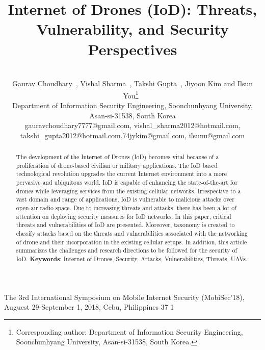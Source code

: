 \documentclass{easychair}
\begin{document}
%
\title{Internet of Drones (IoD): Threats, Vulnerability, and Security Perspectives}

%

\volumeinfo
{The 3rd International Symposium on Mobile Internet Security (MobiSec'18), Auguest 29-September 1, 2018, Cebu, Philippines}
{37}	
{1} 

%
\author{\\
Gaurav Choudhary~, Vishal Sharma~, Takshi Gupta~, Jiyoon Kim and Ilsun You\thanks{Corresponding author: Department of Information Security Engineering, Soonchunhyang University, Asan-si-31538, South Korea.
}~\\
Department of Information Security Engineering, Soonchunhyang University, Asan-si-31538, South Korea\\
gauravchoudhary7777@gmail.com, vishal\_sharma2012@hotmail.com,\\takshi\_gupta2012@hotmail.com,74jykim@gmail.com, ilsunu@gmail.com
}

%


\maketitle

%
\begin{abstract}
\noindent
The development of the Internet of Drones (IoD) becomes vital because of a proliferation of drone-based civilian or military applications. The IoD based technological revolution upgrades the current Internet environment into a more pervasive and ubiquitous world. IoD is capable of enhancing the state-of-the-art for drones while leveraging services from the existing cellular networks. Irrespective to a vast domain and range of applications, IoD is vulnerable to malicious attacks over open-air radio space. Due to increasing threats and attacks, there has been a lot of attention on deploying security measures for IoD networks. In this paper, critical threats and vulnerabilities of IoD are presented. Moreover, taxonomy is created to classify attacks based on the threats and vulnerabilities associated with the networking of drone and their incorporation in the existing cellular setups. In addition, this article summarizes the challenges and research directions to be followed for the security of IoD.
\newline
\newline
\textbf{Keywords}:  Internet of Drones, Security, Attacks, Vulnerabilities, Threats, UAVs.
\end{abstract}
\end{document}
